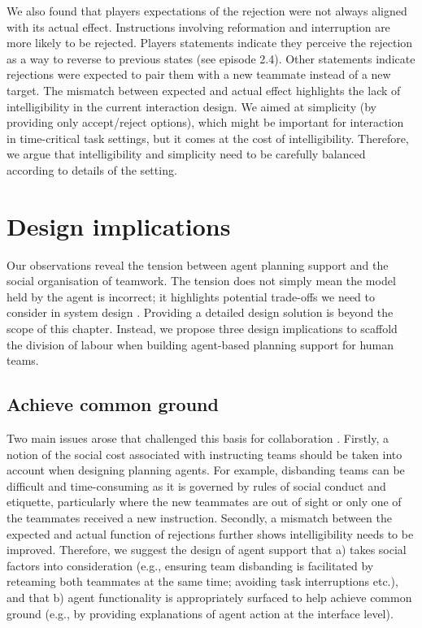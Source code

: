 We also found that players expectations of the rejection were not always aligned with its actual effect. Instructions involving reformation and interruption are more likely to be rejected. Players statements indicate they perceive the rejection as a way to reverse to previous states (see episode 2.4). Other statements indicate rejections were expected to pair them with a new teammate instead of a new target. The mismatch between expected and actual effect highlights the lack of intelligibility in the current interaction design. We aimed at simplicity (by providing only accept/reject options), which might be important for interaction in time-critical task settings, but it comes at the cost of intelligibility. Therefore, we argue that intelligibility and simplicity need to be carefully balanced according to details of the setting.\\


\section{Design implications}

Our observations reveal the tension between agent planning support and the social organisation of teamwork. The tension does not simply mean the model held by the agent is incorrect; it highlights potential trade-offs we need to consider in system design \cite{Bowers1994,Sukthankar}. Providing a detailed design solution is beyond the scope of this chapter. Instead, we propose three design implications to scaffold the division of labour when building agent-based planning support for human teams.\\

\subsection{Achieve common ground}  
Two main issues arose that challenged this basis for collaboration \cite{Bradshaw2011}. Firstly, a notion of the social cost associated with instructing teams should be taken into account when designing planning agents. For example, disbanding teams can be difficult and time-consuming as it is governed by rules of social conduct and etiquette, particularly where the new teammates are out of sight or only one of the teammates received a new instruction. Secondly, a mismatch between the expected and actual function of rejections further shows intelligibility needs to be improved. Therefore, we suggest the design of agent support that a) takes social factors into consideration (e.g., ensuring team disbanding is facilitated by reteaming both teammates at the same time; avoiding task interruptions etc.), and that b) agent functionality is appropriately surfaced to help achieve common ground (e.g., by providing explanations of agent action at the interface level).

